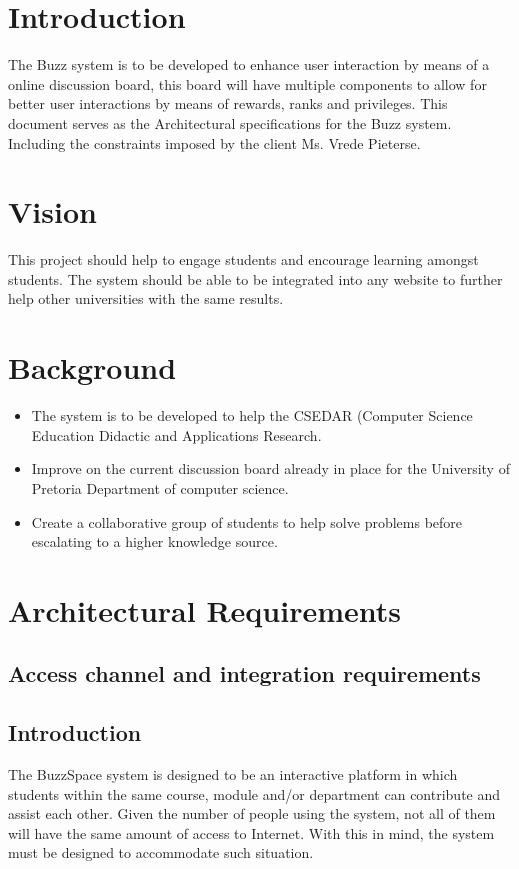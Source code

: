 \documentclass[10pt]{article}
\begin{document}

\newpage
\tableofcontents
\newpage

\section{Introduction}
The Buzz system is to be developed to enhance user interaction by means of a online discussion board, this board will have multiple components to allow for better user interactions by means of rewards, ranks and privileges. This document serves as the Architectural specifications for the Buzz system. Including the constraints imposed by the client Ms. Vrede Pieterse.

\section{Vision}
This project should help to engage students and encourage learning amongst students. The system should be able to be integrated into any website to further help other universities with the same results.

\section{Background}
\begin{itemize}
\item The system is to be developed to help the CSEDAR (Computer Science Education Didactic and Applications Research.
\item Improve on the current discussion board already in place for the University of Pretoria Department of computer science.
\item Create a collaborative group of students to help solve problems before escalating to a higher knowledge source.
\end{itemize}


\section{Architectural Requirements}
\subsection{Access channel and integration requirements} 
\subsection{Introduction}
The BuzzSpace system is designed to be an interactive platform in which students within the same course, module and/or department can contribute and assist each other. Given the number of people using the system, not all of them will have the same amount of access to Internet. With this in mind, the system must be designed to accommodate such situation.
\end{document}
